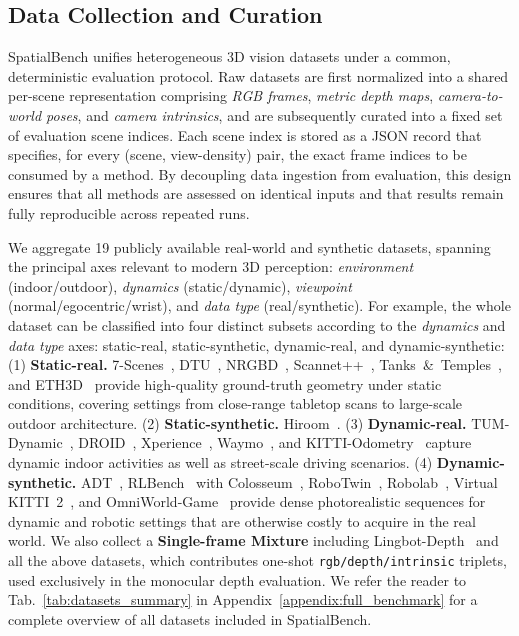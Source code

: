 \documentclass{llmxive}
\providecommand{\benchmark}{SpatialBench\xspace}
\begin{document}
\subsection{Data Collection and Curation}
\label{sec:data}

\benchmark unifies heterogeneous 3D vision datasets under a common, deterministic evaluation protocol.
%
Raw datasets are first normalized into a shared per-scene representation comprising \textit{RGB frames}, \textit{metric depth maps}, \textit{camera-to-world poses}, and \textit{camera intrinsics}, and are subsequently curated into a fixed set of evaluation scene indices.
%
Each scene index is stored as a JSON record that specifies, for every (scene, view-density) pair, the exact frame indices to be consumed by a method.
%
By decoupling data ingestion from evaluation, this design ensures that all methods are assessed on identical inputs and that results remain fully reproducible across repeated runs.


We aggregate 19 publicly available real-world and synthetic datasets, spanning the principal axes relevant to modern 3D perception: \emph{environment} (indoor/outdoor), \emph{dynamics} (static/dynamic), \emph{viewpoint} (normal/egocentric/wrist), and \emph{data type} (real/synthetic).
%
For example, the whole dataset can be classified into four distinct subsets according to the \emph{dynamics} and \emph{data type} axes: static-real, static-synthetic, dynamic-real, and dynamic-synthetic:
%
(1) \textbf{Static-real.} 7-Scenes~\citep{shotton20137scenes}, DTU~\citep{jensen2014dtu}, NRGBD~\citep{azinovic2022Neuralrgbd}, Scannet++~\citep{yeshwanth2023scannet++}, Tanks~\&~Temples~\citep{Knapitsch2017tanks}, and ETH3D~\citep{schops2017eth3d} provide high-quality ground-truth geometry under static conditions, covering settings from close-range tabletop scans to large-scale outdoor architecture.
(2) \textbf{Static-synthetic.} Hiroom~\citep{lin2025depth}.
(3) \textbf{Dynamic-real.} TUM-Dynamic~\citep{sturm12tumdynamic}, DROID~\citep{khazatsky2024droid}, Xperience~\citep{xperience_10m}, Waymo~\citep{sun2020waymo}, and KITTI-Odometry~\citep{geiger2012kittiod} capture dynamic indoor activities as well as street-scale driving scenarios.
(4) \textbf{Dynamic-synthetic.} ADT~\citep{pan2023aria}, RLBench~\citep{james2020rlbench} with Colosseum~\citep{pumacay2024colosseum},  RoboTwin~\citep{chen2025robotwin}, Robolab~\citep{yang2026robolab}, Virtual KITTI~2~\citep{cabon2020vkitti}, and OmniWorld-Game~\citep{zhou2025omniworld} provide dense photorealistic sequences for dynamic and robotic settings that are otherwise costly to acquire in the real world.
%
We also collect a \textbf{Single-frame Mixture} including Lingbot-Depth~\citep{lingbot-depth2026} and all the above datasets, which contributes one-shot \texttt{rgb/depth/intrinsic} triplets, used exclusively in the monocular depth evaluation.
%
We refer the reader to Tab.~\ref{tab:datasets_summary} in Appendix~\ref{appendix:full_benchmark} for a complete overview of all datasets included in \benchmark.
\end{document}
